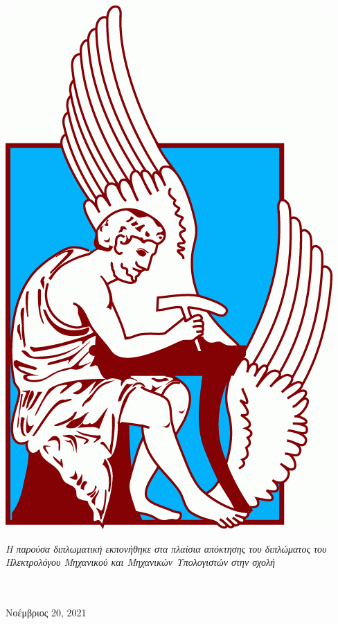 \documentclass[
	12pt, %
	english, %
	onehalfspacing, %
	liststotoc, %
	toctotoc, %
	parskip, %
	headsepline, %
]{MastersDoctoralThesis} %
\begin{document}
\begin{titlepage}
\begin{center}
		\includegraphics[scale=0.22]{Images/TUC_logo.png} %
		\\[0.5cm]

		\vfill

		\large \textit{Η παρούσα διπλωματική εκπονήθηκε στα πλαίσια απόκτησης του διπλώματος του Ηλεκτρολόγου Μηχανικού και Μηχανικών Υπολογιστών στην σχολή}\\[0.1cm] %
		\deptname\\\groupname\\[0.4cm] %

		\vfill

		{\large Νοέμβριος 20, 2021 }\\[2cm] %

		\vfill
	\end{center}
\end{titlepage}
\end{document}
